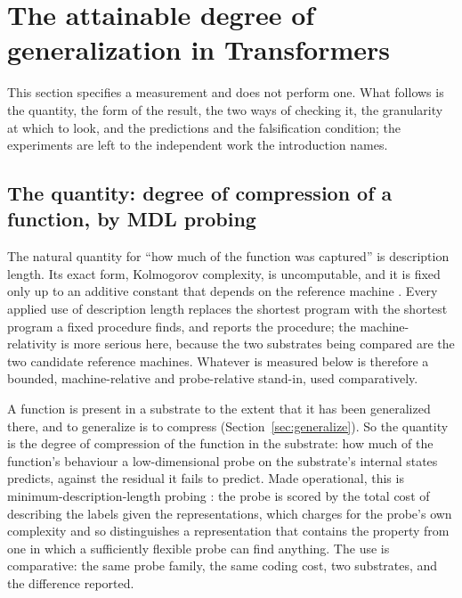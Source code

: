 \section{The attainable degree of generalization in Transformers}
\label{sec:degree}
\label{sec:measurement}

This section specifies a measurement and does not perform one. What follows is the quantity, the
form of the result, the two ways of checking it, the granularity at which to look, and the predictions
and the falsification condition; the experiments are left to the independent work the introduction
names.

\subsection{The quantity: degree of compression of a function, by MDL probing}
\label{sec:quantity}
\label{sec:measure}

The natural quantity for ``how much of the function was captured'' is description length. Its exact
form, Kolmogorov complexity, is uncomputable, and it is fixed only up to an additive constant that
depends on the reference machine \citep{livitanyi2019}. Every applied use of description length
replaces the shortest program with the shortest program a fixed procedure finds, and reports the
procedure; the machine-relativity is more serious here, because the two substrates being compared are
the two candidate reference machines. Whatever is measured below is therefore a bounded,
machine-relative and probe-relative stand-in, used comparatively.

A function is present in a substrate to the extent that it has been generalized there, and to
generalize is to compress (Section~\ref{sec:generalize}). So the quantity is the degree of compression
of the function in the substrate: how much of the function's behaviour a low-dimensional probe on the
substrate's internal states predicts, against the residual it fails to predict. Made operational, this
is minimum-description-length probing \citep{voita2020}: the probe is scored by the total cost of
describing the labels given the representations, which charges for the probe's own complexity and so
distinguishes a representation that contains the property from one in which a sufficiently flexible
probe can find anything. The use is comparative: the same probe family, the same coding cost, two
substrates, and the difference reported.

